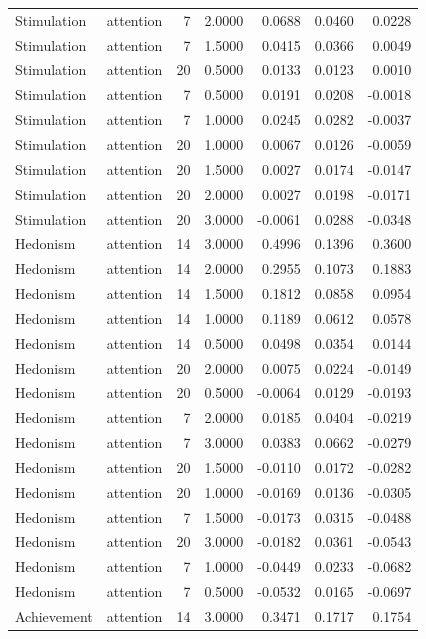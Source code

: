 \begin{tabular}{llrrrrr}
Stimulation & attention & 7 & 2.0000 & 0.0688 & 0.0460 & 0.0228 \\
Stimulation & attention & 7 & 1.5000 & 0.0415 & 0.0366 & 0.0049 \\
Stimulation & attention & 20 & 0.5000 & 0.0133 & 0.0123 & 0.0010 \\
Stimulation & attention & 7 & 0.5000 & 0.0191 & 0.0208 & -0.0018 \\
Stimulation & attention & 7 & 1.0000 & 0.0245 & 0.0282 & -0.0037 \\
Stimulation & attention & 20 & 1.0000 & 0.0067 & 0.0126 & -0.0059 \\
Stimulation & attention & 20 & 1.5000 & 0.0027 & 0.0174 & -0.0147 \\
Stimulation & attention & 20 & 2.0000 & 0.0027 & 0.0198 & -0.0171 \\
Stimulation & attention & 20 & 3.0000 & -0.0061 & 0.0288 & -0.0348 \\
Hedonism & attention & 14 & 3.0000 & 0.4996 & 0.1396 & 0.3600 \\
Hedonism & attention & 14 & 2.0000 & 0.2955 & 0.1073 & 0.1883 \\
Hedonism & attention & 14 & 1.5000 & 0.1812 & 0.0858 & 0.0954 \\
Hedonism & attention & 14 & 1.0000 & 0.1189 & 0.0612 & 0.0578 \\
Hedonism & attention & 14 & 0.5000 & 0.0498 & 0.0354 & 0.0144 \\
Hedonism & attention & 20 & 2.0000 & 0.0075 & 0.0224 & -0.0149 \\
Hedonism & attention & 20 & 0.5000 & -0.0064 & 0.0129 & -0.0193 \\
Hedonism & attention & 7 & 2.0000 & 0.0185 & 0.0404 & -0.0219 \\
Hedonism & attention & 7 & 3.0000 & 0.0383 & 0.0662 & -0.0279 \\
Hedonism & attention & 20 & 1.5000 & -0.0110 & 0.0172 & -0.0282 \\
Hedonism & attention & 20 & 1.0000 & -0.0169 & 0.0136 & -0.0305 \\
Hedonism & attention & 7 & 1.5000 & -0.0173 & 0.0315 & -0.0488 \\
Hedonism & attention & 20 & 3.0000 & -0.0182 & 0.0361 & -0.0543 \\
Hedonism & attention & 7 & 1.0000 & -0.0449 & 0.0233 & -0.0682 \\
Hedonism & attention & 7 & 0.5000 & -0.0532 & 0.0165 & -0.0697 \\
Achievement & attention & 14 & 3.0000 & 0.3471 & 0.1717 & 0.1754 \\

\end{tabular}
